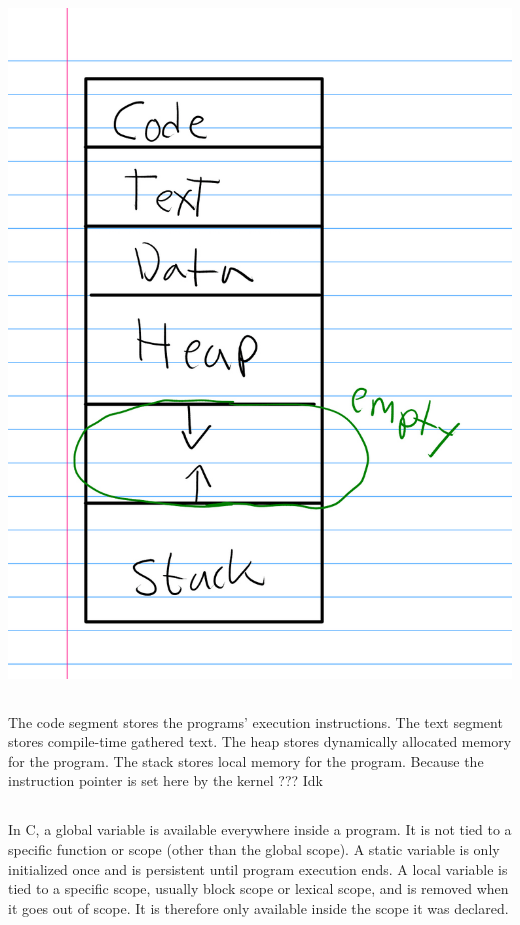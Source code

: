 \documentclass{article}
\begin{document}
\subsection{}
\includegraphics{address_space.jpg}

\subsection{}
The code segment stores the programs' execution instructions. The text segment stores compile-time gathered text. The heap stores dynamically allocated memory for the program. The stack stores local memory for the program.  
Because the instruction pointer is set here by the kernel ??? Idk 

\subsection{}
In C, a global variable is available everywhere inside a program. It is not tied to a specific function or scope (other than the global scope). A static variable is only initialized once and is persistent until program execution ends. A local variable is tied to a specific scope, usually block scope or lexical scope, and is removed when it goes out of scope. It is therefore only available inside the scope it was declared. 
\end{document}
